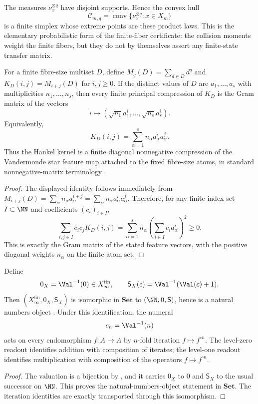 The measures \(\nu_x^{\otimes q}\) have disjoint supports.  Hence the
convex hull
\[
  \mathcal C_{m,q}
  =\operatorname{conv}\{\nu_x^{\otimes q}:x\in X_m\}
\]
is a finite simplex whose extreme points are these product laws.  This
is the elementary probabilistic form of the finite-fiber certificate:
the collision moments weight the finite fibers, but they do not by
themselves assert any finite-state transfer matrix.

\begin{proposition}
\label{thm:star-kernel}
For a finite fibre-size multiset \(D\), define
\(M_q(D)=\sum_{d\in D}d^q\) and \(K_D(i,j)=M_{i+j}(D)\) for \(i,j\ge0\).  If the
distinct values of \(D\) are \(a_1,\ldots,a_s\) with multiplicities
\(n_1,\ldots,n_s\), then every finite principal compression of \(K_D\) is the
Gram matrix of the vectors
\[
  i\longmapsto (\sqrt{n_1}a_1^i,\ldots,\sqrt{n_s}a_s^i).
\]
Equivalently,
\[
  K_D(i,j)=\sum_{\alpha=1}^s n_\alpha a_\alpha^i a_\alpha^j .
\]
Thus the Hankel kernel is a finite diagonal nonnegative compression of the
Vandermonde star feature map attached to the fixed fibre-size atoms, in standard
nonnegative-matrix terminology \cite{BermanPlemmons1994}.
\end{proposition}

\begin{proof}
The displayed identity follows immediately from
\(M_{i+j}(D)=\sum_\alpha n_\alpha a_\alpha^{i+j}
=\sum_\alpha n_\alpha a_\alpha^i a_\alpha^j\).  Therefore, for any finite index
set \(I\subset\NN\) and coefficients \((c_i)_{i\in I}\),
\[
  \sum_{i,j\in I}c_i c_jK_D(i,j)
  =\sum_{\alpha=1}^s n_\alpha\left(\sum_{i\in I}c_i a_\alpha^i\right)^2\ge0.
\]
This is exactly the Gram matrix of the stated feature vectors, with the positive
diagonal weights \(n_\alpha\) on the finite atom set.
\end{proof}

\begin{proposition}
\label{prop:nno}
Define
\[
  0_X=\Val^{-1}(0)\in X_{\infty}^{\mathrm{fin}},\qquad
  \mathsf S_X(c)=\Val^{-1}(\Val(c)+1).
\]
Then \((X_{\infty}^{\mathrm{fin}},0_X,\mathsf S_X)\) is
isomorphic in \(\mathbf{Set}\) to
\((\NN,0,\mathsf S)\), hence is a natural numbers object
\cite{Lawvere1964}.  Under this identification, the numeral
\[
  c_n=\Val^{-1}(n)
\]
acts on every endomorphism \(f\colon A\to A\) by \(n\)-fold
iteration \(f\mapsto f^{\circ n}\).  The level-zero readout
identifies addition with composition of iterates; the level-one
readout identifies multiplication with composition of the operators
\(f\mapsto f^{\circ n}\).
\end{proposition}

\begin{proof}
The valuation is a bijection by , and it
carries \(0_X\) to \(0\) and \(\mathsf S_X\) to the usual successor
on \(\NN\).  This proves the natural-numbers-object statement in
\(\mathbf{Set}\).  The iteration identities are exactly
 transported through this isomorphism.
\end{proof}


